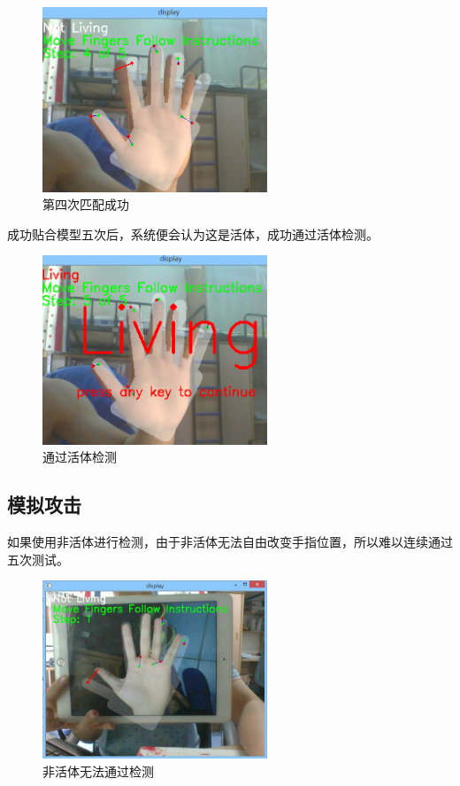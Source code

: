 \documentclass[UTF8, a4paper, fontset=none]{article}
\begin{document}
	\begin{figure}
    \centering
    \includegraphics[width=0.6\textwidth]{./test2.png}
    \caption{第四次匹配成功}
    \label{hand}
	\end{figure}
	
	成功贴合模型五次后，系统便会认为这是活体，成功通过活体检测。
	
	\begin{figure}
    \centering
    \includegraphics[width=0.6\textwidth]{./finish.png}
    \caption{通过活体检测}
    \label{hand}
	\end{figure}

    \subsection{模拟攻击}
	
	如果使用非活体进行检测，由于非活体无法自由改变手指位置，所以难以连续通过五次测试。
	
	\begin{figure}
    \centering
    \includegraphics[width=0.6\textwidth]{./fault.jpg}
    \caption{非活体无法通过检测}
    \label{hand}
	\end{figure}
\end{document}
